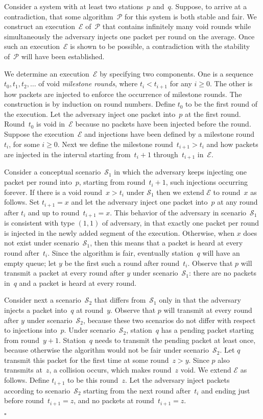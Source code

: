 \documentclass[11pt]{article}
\newcommand{\cE}{\mathcal{E}}
\newcommand{\cP}{\mathcal{P}}
\newcommand{\cS}{\mathcal{S}}
\newcommand{\qed}{\hfill $\square$ \smallbreak}
\newenvironment{proof}{\noindent{\bf Proof:}}{\qed}
\begin{document}
\begin{proof}
Consider a system with at least two stations~$p$ and~$q$.
Suppose, to arrive at a contradiction, that some algorithm~$\cP$ for this system is both stable and fair.
We construct an execution~$\cE$ of~$\cP$ that contains infinitely many void rounds while simultaneously  the adversary injects one packet per round on the average.
Once such an execution~$\cE$ is shown to be possible, a contradiction with the stability of~$\cP$ will have been established.

We determine an execution~$\cE$  by specifying two components.
One is a sequence $t_{0}, t_{1},t_{2},\ldots$ of void \emph{milestone rounds}, where $t_{i}<t_{i+1}$ for any $i\ge 0$.
The other is how packets are injected to enforce the occurrence of milestone rounds.
The construction is by induction on round numbers.
Define $t_{0}$ to be the first round of the execution.
Let the adversary inject one packet into~$p$ at the first round.
Round~$t_0$ is void in~$\cE$ because no packets have been injected before the round.
Suppose the execution~$\cE$ and injections have been defined by a milestone round~$t_{i}$, for some $i\ge 0$.
Next we define the milestone round~$t_{i+1}>t_{i}$ and how packets are injected in the interval starting from~$t_{i}+1$ through~$t_{i+1}$ in~$\cE$.

Consider a conceptual scenario~$\cS_1$ in which the adversary keeps injecting one packet per round into~$p$, starting from round~$t_{i}+1$, such injections occurring forever.
If there is a void round~$x>t_i$ under $\cS_1$ then we extend $\cE$ to round~$x$ as follows.
Set $t_{i+1}=x$ and let the adversary inject one packet into~$p$ at any round after $t_i$ and up to round~$t_{i+1}=x$.
This behavior of the adversary in scenario~$\cS_1$ is consistent with type $(1,1)$ of adversary, in that exactly one packet per round is injected in the newly added segment of the execution.
Otherwise, when $x$ does not exist under scenario~$\cS_1$, then this means that a packet is heard at every round after~$t_i$.
Since the algorithm is fair, eventually station~$q$ will have an empty queue; let $y$ be the first such a round after round~$t_{i}$.
Observe that $p$ will transmit a packet at every round after $y$ under scenario~$\cS_1$: there are no packets in~$q$ and a packet is heard at every round.

Consider next a scenario~$\cS_2$ that differs from~$\cS_1$ only in that the adversary injects a packet into~$q$ at round~$y$.
Observe that $p$ will transmit at every round after $y$ under scenario~$\cS_2$, because these two scenarios do not differ with respect to injections into~$p$.
Under scenario~$\cS_2$, station~$q$ has a pending packet starting from round~$y+1$.
Station~$q$ needs to transmit the pending packet at least once, because otherwise the algorithm would not be fair under scenario~$\cS_2$.
Let $q$ transmit this packet for the first time at some round~$z>y$.
Since $p$ also transmits at~$z$, a collision occurs, which makes round~$z$ void.
We extend $\cE$ as follows.
Define $t_{i+1}$ to be this round~$z$.
Let the adversary inject packets according to scenario~$\cS_2$ starting from the next round after~$t_i$ and ending just before round~$t_{i+1}=z$, and no packets at round~$t_{i+1}=z$.


\end{proof}
\end{document}
